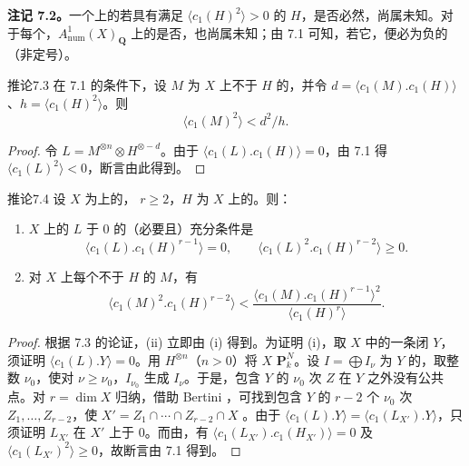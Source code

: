 \textbf{注记 7.2。}一个上的若具有满足 $\langle c_1(H)^2\rangle>0$ 的 $H$，是否必然，尚属未知。对于每个，$A^1_{\mathrm{num}}(X)_{\mathbf Q}$ 上的是否，也尚属未知；由 7.1 可知，若它，便必为负的（非定号）。
\begin{SGAresult}{推论}{7.3}
在 7.1 的条件下，设 $M$ 为 $X$ 上不于 $H$ 的，并令 $d=\langle c_1(M).c_1(H)\rangle$、$h=\langle c_1(H)^2\rangle$。则
\[\langle c_1(M)^2\rangle<d^2/h.\]
\end{SGAresult}
\begin{proof}
令 $L=M^{\otimes n}\otimes H^{\otimes-d}$。由于 $\langle c_1(L).c_1(H)\rangle=0$，由 7.1 得 $\langle c_1(L)^2\rangle<0$，断言由此得到。
\end{proof}
\begin{SGAresult}{推论}{7.4}
设 $X$ 为上的， $r\geq2$，$H$ 为 $X$ 上的。则：
\begin{enumerate}
\item[(i)] $X$ 上的 $L$ 于 $0$ 的（必要且）充分条件是
\[\langle c_1(L).c_1(H)^{r-1}\rangle=0,\qquad
\langle c_1(L)^2.c_1(H)^{r-2}\rangle\geq0.\]
\item[(ii)] 对 $X$ 上每个不于 $H$ 的 $M$，有
\[\langle c_1(M)^2.c_1(H)^{r-2}\rangle
<\frac{\langle c_1(M).c_1(H)^{r-1}\rangle^2}{\langle c_1(H)^r\rangle}.\]
\end{enumerate}
\end{SGAresult}
\begin{proof}
根据 7.3 的论证，(ii) 立即由 (i) 得到。为证明 (i)，取 $X$ 中的一条闭 $Y$，须证明 $\langle c_1(L).Y\rangle=0$。用 $H^{\otimes n}$（$n>0$）将 $X$  $\mathbf P^N_k$。设 $I=\bigoplus I_\nu$ 为 $Y$ 的，取整数 $\nu_0$，使对 $\nu\geq\nu_0$，$I_{\nu_0}$ 生成 $I_\nu$。于是，包含 $Y$ 的 $\nu_0$ 次 $Z$ 在 $Y$ 之外没有公共点。对 $r=\dim X$ 归纳，借助 Bertini ，可找到包含 $Y$ 的 $r-2$ 个 $\nu_0$ 次 $Z_1,\ldots,Z_{r-2}$，使 $X'=Z_1\cap\cdots\cap Z_{r-2}\cap X$ 。由于 $\langle c_1(L).Y\rangle=\langle c_1(L_{X'}).Y\rangle$，只须证明 $L_{X'}$ 在 $X'$ 上于 $0$。而由，有 $\langle c_1(L_{X'}).c_1(H_{X'})\rangle=0$ 及 $\langle c_1(L_{X'})^2\rangle\geq0$，故断言由 7.1 得到。
\end{proof}
